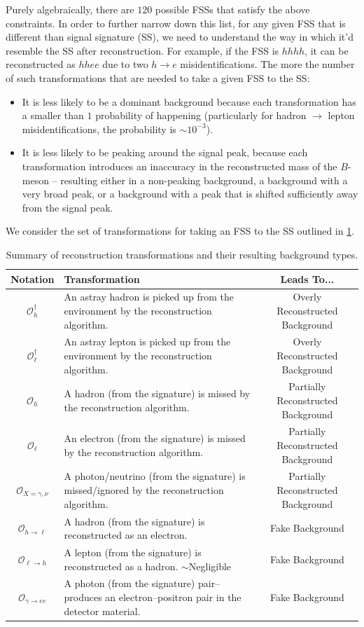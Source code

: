 Purely algebraically, there are $120$ possible FSSs that satisfy the above constraints. %
In order to further narrow down this list, for any given FSS that is different than signal signature (SS), we need to understand the way in which it'd resemble the SS after reconstruction. For example, if the FSS is $hhhh$, it can be reconstructed as $hhee$ due to two $h\to e$ misidentifications. %
The more the number of such transformations that are needed to take a given FSS to the SS:
			\begin{itemize}
				\item It is less likely to be a dominant background because each transformation has a smaller than $1$ probability of happening (particularly for hadron $\to$ lepton misidentifications, the probability is $\sim 10^{-3}$).
				\item It is less likely to be peaking around the signal peak, because each transformation introduces an inaccuracy in the reconstructed mass of the $B$-meson -- resulting either in a non-peaking background, a background with a very broad peak, or a background with a peak that is shifted sufficiently away from the signal peak.
			\end{itemize}
We consider the set of transformations for taking an FSS to the SS outlined in \ref{tab:list-transformations}. %
\begin{table}[ht]
\centering
\begin{tabular}{|c|p{8cm}|c|}
\hline
\textbf{Notation} & \textbf{Transformation} & \textbf{Leads To...} \\
\hline
$\mathcal{O}_{h}^\dagger$ & An astray hadron is picked up from the environment by the reconstruction algorithm. & Overly Reconstructed Background \\
$\mathcal{O}_{\ell}^\dagger$ & An astray lepton is picked up from the environment by the reconstruction algorithm. & Overly Reconstructed Background \\
$\mathcal{O}_{h}$ & A hadron (from the signature) is missed by the reconstruction algorithm. & Partially Reconstructed Background \\
$\mathcal{O}_{\ell}$ & An electron (from the signature) is missed by the reconstruction algorithm. & Partially Reconstructed Background \\
$\mathcal{O}_{X=\gamma,\nu}$ & A photon/neutrino (from the signature) is missed/ignored by the reconstruction algorithm. & Partially Reconstructed Background \\
$\mathcal{O}_{h\to \ell}$ & A hadron (from the signature) is reconstructed as an electron. & Fake Background \\
$\mathcal{O}_{\ell\to h}$ & A lepton (from the signature) is reconstructed as a hadron. $\sim$Negligible & Fake Background \\
$\mathcal{O}_{\gamma \to ee}$ & A photon (from the signature) pair--produces an electron--positron pair in the detector material. & Fake Background \\
\hline
\end{tabular}
\caption{Summary of reconstruction transformations and their resulting background types.}
\label{tab:list-transformations}
\end{table}
